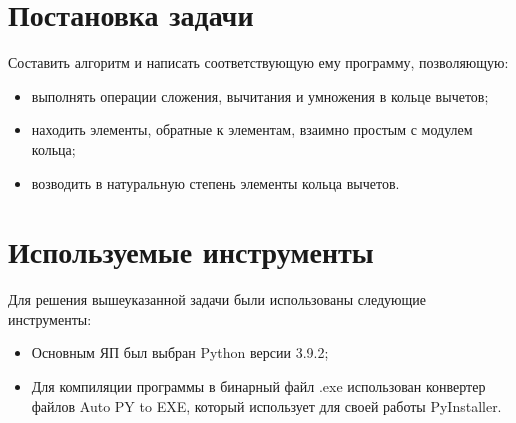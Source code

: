 \section{Постановка задачи}
Составить алгоритм и написать соответствующую ему программу, позволяющую:
\begin{itemize}
    \item выполнять операции сложения, вычитания и умножения в кольце вычетов;
    \item находить элементы, обратные к элементам, взаимно простым с модулем кольца;
    \item возводить в натуральную степень элементы кольца вычетов.
\end{itemize}


\clearpage
\section{Используемые инструменты}
Для решения вышеуказанной задачи были использованы следующие инструменты:
\begin{itemize}
    \item Основным ЯП был выбран Python версии 3.9.2;
    \item Для компиляции программы в бинарный файл .exe использован конвертер файлов Auto PY to EXE,
    который использует для своей работы PyInstaller.
\end{itemize}


\clearpage
